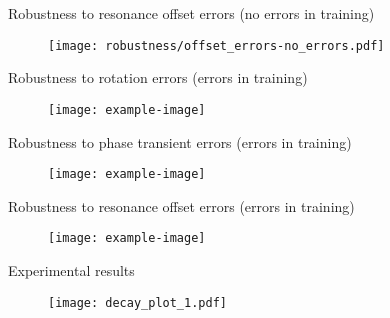 \documentclass{beamer}
\begin{document}
\begin{frame}{Robustness to resonance offset errors  (no errors in training)}

\begin{figure}
    \centering
    \texttt{[image: robustness/offset\_errors-no\_errors.pdf]}
\end{figure}

\end{frame}


\begin{frame}{Robustness to rotation errors (errors in training)}

\begin{figure}
    \centering
    \texttt{[image: example-image]}
\end{figure}

\end{frame}

\begin{frame}{Robustness to phase transient errors (errors in training)}

\begin{figure}
    \centering
    \texttt{[image: example-image]}
\end{figure}

\end{frame}

\begin{frame}{Robustness to resonance offset errors (errors in training)}

\begin{figure}
    \centering
    \texttt{[image: example-image]}
\end{figure}

\end{frame}

\begin{frame}{Experimental results}

\begin{figure}
\centering
\texttt{[image: decay\_plot\_1.pdf]}
\end{figure}

\end{frame}
\end{document}
